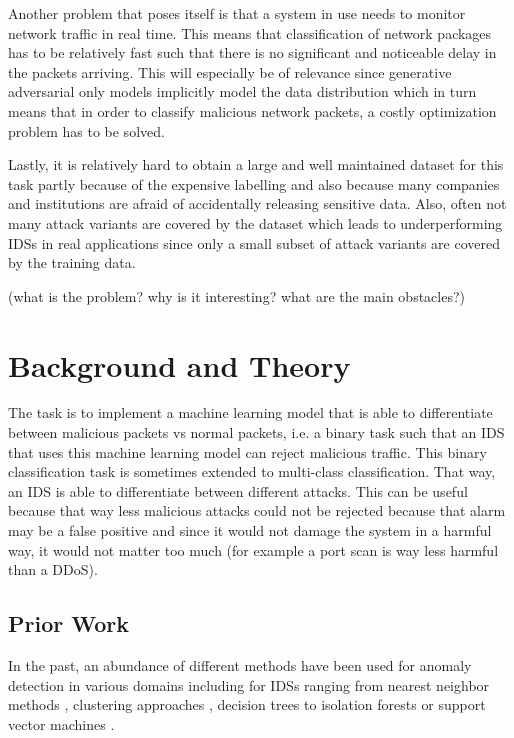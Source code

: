 \documentclass[]{article}
\begin{document}
	\noindent
	Another problem that poses itself is that a system in use needs to monitor network traffic in real time. This means that classification of network packages has to be relatively fast such that there is no significant and noticeable delay in the packets arriving. This will especially be of relevance since generative adversarial only models implicitly model the data distribution which in turn means that in order to classify malicious network packets, a costly optimization problem has to be solved.
	\newline
	
	\noindent
	Lastly, it is relatively hard to obtain a large and well maintained dataset for this task partly because of the expensive labelling and also because many companies and institutions are afraid of accidentally releasing sensitive data. Also, often not many attack variants are covered by the dataset which leads to underperforming IDSs in real applications since only a small subset of attack variants are covered by the training data. 
	
	(what is the problem? why is it interesting? what are the main obstacles?)
	
	\section{Background and Theory}

	
	 The task is to implement a machine learning model that is able to differentiate between malicious packets vs normal packets, i.e. a binary task such that an IDS that uses this machine learning model can reject malicious traffic. This binary classification task is sometimes extended to multi-class classification. That way, an IDS is able to differentiate between different attacks. This can be useful because that way less malicious attacks could not be rejected because that alarm may be a false positive and since it would not damage the system in a harmful way, it would not matter too much (for example a port scan is way less harmful than a DDoS).

	\subsection{Prior Work}
	 In the past, an abundance of different methods have been used for anomaly detection in various domains including for IDSs ranging from nearest neighbor methods \cite{5377998}, clustering approaches \cite{4244796}, decision trees \cite{6511281} to isolation forests \cite{DING201312} or support vector machines \cite{1234567}. 
	 \newline
	 
\end{document}
